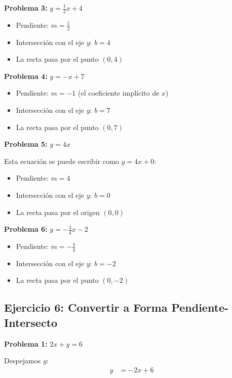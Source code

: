 \medskip

\textbf{Problema 3:} $y = \frac{1}{2}x + 4$

\begin{itemize}
    \item Pendiente: $m = \frac{1}{2}$
    \item Intersección con el eje $y$: $b = 4$
    \item La recta pasa por el punto $(0, 4)$
\end{itemize}

\medskip

\textbf{Problema 4:} $y = -x + 7$

\begin{itemize}
    \item Pendiente: $m = -1$ (el coeficiente implícito de $x$)
    \item Intersección con el eje $y$: $b = 7$
    \item La recta pasa por el punto $(0, 7)$
\end{itemize}

\medskip

\textbf{Problema 5:} $y = 4x$

Esta ecuación se puede escribir como $y = 4x + 0$:
\begin{itemize}
    \item Pendiente: $m = 4$
    \item Intersección con el eje $y$: $b = 0$
    \item La recta pasa por el origen $(0, 0)$
\end{itemize}

\medskip

\textbf{Problema 6:} $y = -\frac{3}{4}x - 2$

\begin{itemize}
    \item Pendiente: $m = -\frac{3}{4}$
    \item Intersección con el eje $y$: $b = -2$
    \item La recta pasa por el punto $(0, -2)$
\end{itemize}

\newpage

\subsection*{Ejercicio 6: Convertir a Forma Pendiente-Intersecto}

\textbf{Problema 1:} $2x + y = 6$

Despejamos $y$:
\begin{align*}
y &= -2x + 6
\end{align*}

